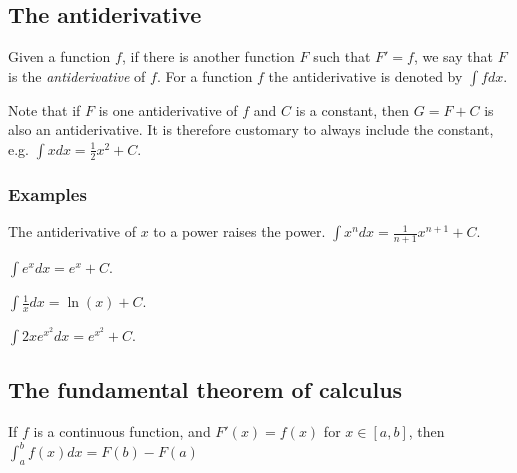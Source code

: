 \documentclass[12pt,a4paper]{article}
\theoremstyle{regla}
\theoremstyle{remark}
\theoremstyle{definition}
\theoremstyle{nonumberbreak}
\begin{document}
\subsection{The antiderivative}
\begin{fbox}
\begin{minipage}{0.97\textwidth}
Given a function $f$, if there is another function $F$ such that $F'=f$, we say that $F$ is the {\em antiderivative} of $f$. For a function $f$ the antiderivative is denoted by $\int f dx$.

Note that if $F$ is one antiderivative of $f$ and $C$ is a constant, then $G=F+C$ is also an antiderivative. It is therefore customary to always include the constant, e.g. $\int x dx=\frac{1}{2}x^2+C$.
 
\end{minipage}
\end{fbox}
\subsubsection{Examples}
\begin{xmpl}
The antiderivative of $x$ to a power raises the power. 
$\int x^n dx=\frac{1}{n+1}x^{n+1} +C$.
\end{xmpl}
\begin {xmpl}

$\int e^x dx=e^x+C$.

\end{xmpl}
\begin{xmpl}

$\int \frac{1}{x} dx=\ln(x)+C$.


\end{xmpl}
\begin{xmpl}

$\int 2xe^{x^2} dx=e^{x^2}+C$.
\end{xmpl}

\subsection{The fundamental theorem of calculus}
\begin{fbox}
\begin{minipage}{0.97\textwidth}
If $f$ is a continuous function, and $F'(x)=f(x)$ for $x\in[a,b]$, then $\int_a^b f(x)dx=F(b)-F(a)$
\end{minipage}
\end{fbox}
\end{document}
